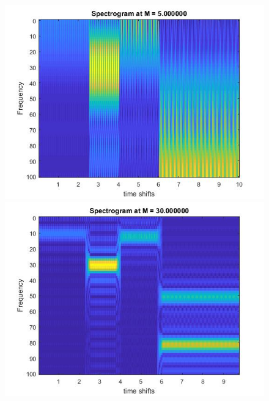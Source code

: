 \documentclass{article}
\begin{document}
\begin{figure}[H]

\includegraphics[scale = .5]{report5}
\includegraphics[scale = .5]{report5_2}
\end{figure}

\begin{figure}[H]

\end{figure}
\end{document}
